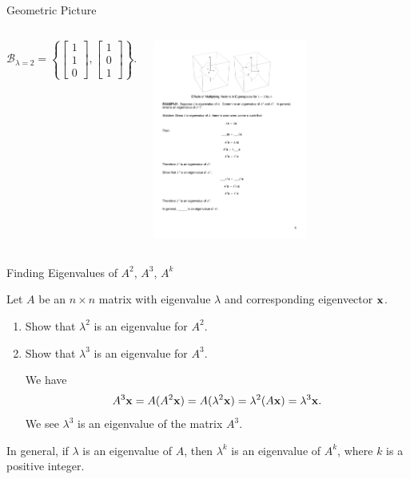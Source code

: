 \documentclass[xcolor=dvipsnames,aspectratio=169,t]{beamer}
\begin{document}
\begin{frame}{Geometric Picture}
\begin{columns}[T]
  \[ \mathcal{B}_{\lambda =2} = \left\{ \begin{bmatrix} 1 \\ 1 \\ 0 \end{bmatrix} , \begin{bmatrix} 1 \\ 0 \\ 1 \end{bmatrix} \right\}. \]

  \includegraphics[width=2in]{images/fig-eigenspace3d.pdf}

  \end{columns}
\end{frame}


\begin{frame}{Finding Eigenvalues of $A^2$, $A^3$, $A^k$}
  \smallskip

  Let $A$ be an $n \times n$ matrix with eigenvalue $\lambda$ and corresponding eigenvector $\mathbf{x}$.

  \begin{enumerate}

  \item Show that $\lambda^2$ is an eigenvalue for $A^2$.
  \smallskip

  \pause
  \bigskip

  \pause
  \item Show that $\lambda^3$ is an eigenvalue for $A^3$.
  \smallskip

  \alert{We have
  \[ A^3 \mathbf{x} = A (A^2 \mathbf{x}) = A (\lambda^2 \mathbf{x} ) = \lambda^2 (A \mathbf{x}) = \lambda^3 \mathbf{x}. \]
  We see $\lambda^3$ is an eigenvalue of the matrix $A^3$.}
  \end{enumerate}

  \pause
  \bbox
  In general, if $\lambda$ is an eigenvalue of $A$, then $\lambda^k$ is an eigenvalue of $A^k$, where $k$ is a positive integer.
  \ebox
\end{frame}
\end{document}
